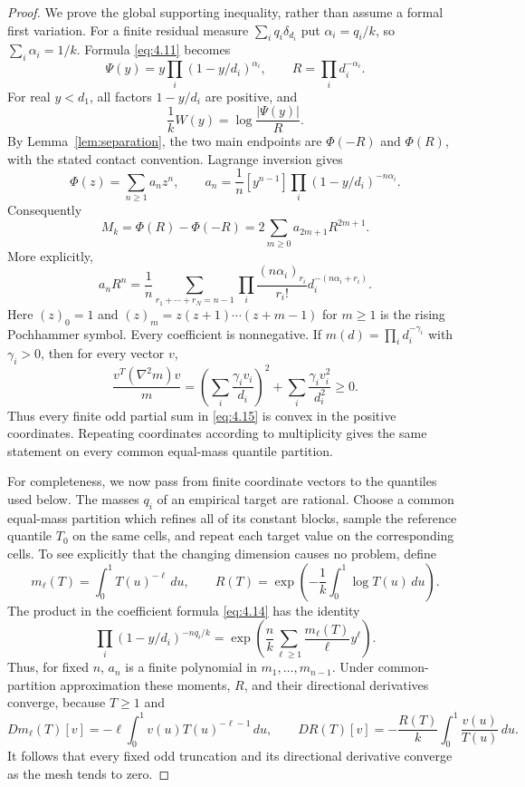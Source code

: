 \documentclass[11pt]{article}
\numberwithin{equation}{section}
\theoremstyle{plain}
\theoremstyle{definition}
\theoremstyle{remark}
\newcommand{\1}{\mathbf 1}
\newcommand{\dd}{\,d}
\begin{document}
\begin{proof}
We prove the global supporting inequality, rather than assume a formal
first variation.  For a finite residual measure
$\sum_iq_i\delta_{d_i}$ put $\alpha_i=q_i/k$, so
$\sum_i\alpha_i=1/k$.  Formula \eqref{eq:4.11} becomes
\[
 \Psi(y)=y\prod_i(1-y/d_i)^{\alpha_i},\qquad
 R=\prod_i d_i^{-\alpha_i}.
\]
For real $y<d_1$, all factors $1-y/d_i$ are positive, and
\[
 \frac1kW(y)=\log\frac{|\Psi(y)|}{R}.
\]
By Lemma~\ref{lem:separation}, the two main endpoints are $\Phi(-R)$ and
$\Phi(R)$, with the stated contact convention.  Lagrange inversion gives
\begin{equation}
 \Phi(z)=\sum_{n\ge1}a_nz^n,\qquad
 a_n=\frac1n[y^{n-1}]\prod_i(1-y/d_i)^{-n\alpha_i}.
\label{eq:4.14}
\end{equation}
Consequently
\begin{equation}
 M_k=\Phi(R)-\Phi(-R)=2\sum_{m\ge0}a_{2m+1}R^{2m+1}.
\label{eq:4.15}
\end{equation}
More explicitly,
\begin{equation}
 a_nR^n=\frac1n
 \sum_{r_1+\cdots+r_N=n-1}
 \prod_i\frac{(n\alpha_i)_{r_i}}{r_i!}
 d_i^{-(n\alpha_i+r_i)}.
\label{eq:4.16}
\end{equation}
Here $(z)_0=1$ and
$(z)_m=z(z+1)\cdots(z+m-1)$ for $m\ge1$ is the rising Pochhammer symbol.
Every coefficient is nonnegative.  If
$m(d)=\prod_i d_i^{-\gamma_i}$ with $\gamma_i>0$, then for every vector
$v$,
\[
 \frac{v^T(\nabla^2m)v}{m}
 =\left(\sum_i\frac{\gamma_iv_i}{d_i}\right)^2
  +\sum_i\frac{\gamma_iv_i^2}{d_i^2}\ge0.
\]
Thus every finite odd partial sum in \eqref{eq:4.15} is convex in the positive
coordinates.  Repeating coordinates according to multiplicity gives the
same statement on every common equal-mass quantile partition.

For completeness, we now pass from finite coordinate vectors to the
quantiles used below.  The masses $q_i$ of an empirical target are
rational.  Choose a common equal-mass partition which refines all of its
constant blocks, sample the reference quantile $T_0$ on the same cells,
and repeat each target value on the corresponding cells.  To see explicitly
that the changing dimension causes no problem, define
\[
 m_\ell(T)=\int_0^1T(u)^{-\ell}\dd u,
 \qquad R(T)=\exp\left(-\frac1k\int_0^1\log T(u)\dd u\right).
\]
The product in the coefficient formula \eqref{eq:4.14} has the identity
\[
 \prod_i(1-y/d_i)^{-nq_i/k}
 =\exp\left(\frac nk\sum_{\ell\ge1}
 \frac{m_\ell(T)}\ell y^\ell\right).
\]
Thus, for fixed $n$, $a_n$ is a finite polynomial in
$m_1,\ldots,m_{n-1}$.  Under common-partition approximation these moments,
$R$, and their directional derivatives converge, because $T\ge1$ and
\[
 Dm_\ell(T)[v]=-\ell\int_0^1v(u)T(u)^{-\ell-1}\dd u,
 \qquad
 DR(T)[v]=-\frac{R(T)}k\int_0^1\frac{v(u)}{T(u)}\dd u.
\]
It follows that every fixed odd truncation and its directional derivative
converge as the mesh tends to zero.


\end{proof}
\end{document}
